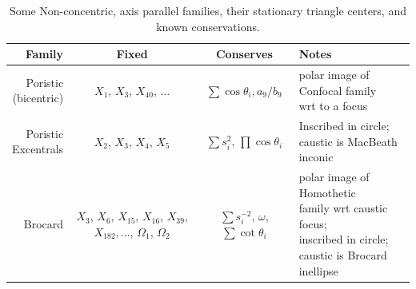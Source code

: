 \begin{table}
\centering
\begin{tabular}{|r|c|c|l|}
\hline
Family & Fixed & Conserves & Notes \\
\hline
\makecell[rc]{Poristic\\(bicentric)} & $X_1$, $X_3$, $X_{40}$, $\ldots$ & $\sum\cos\theta_i,a_9/b_9$ & \makecell[lc]{polar image of Confocal family\\wrt to a focus} \\
\hline
\makecell[rt]{Poristic\\Excentrals} & $X_2$, $X_3$, $X_4$, $X_5$ & $\sum{s_i^2}$, $\prod\cos\theta_i$ & \makecell[lt]{Inscribed in circle;\\caustic is MacBeath inconic} \\
\hline
Brocard & \makecell[lc]{$X_3$, $X_6$, $X_{15}$, $X_{16}$,\\$X_{39}$, $X_{182},\ldots$,\\$\Omega_1$, $\Omega_2$} & $\sum{s_i^{-2}}$, $\omega$, $\sum\cot\theta_i$ & \makecell[lc]{polar image of Homothetic\\family wrt caustic focus;\\inscribed in circle;\\caustic is Brocard inellipse}\\
\hline
\end{tabular}
\caption{Some Non-concentric, axis parallel families, their stationary triangle centers, and known conservations.}
\label{tab:n3-non-conc-families}
\end{table}
